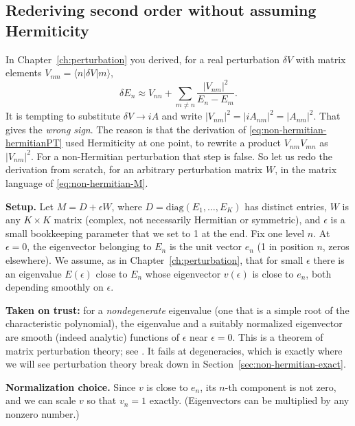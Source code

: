 \subsection{Rederiving second order without assuming Hermiticity}

In Chapter~\ref{ch:perturbation} you derived, for a real perturbation $\delta V$ with matrix elements $V_{nm}=\langle n|\delta V|m\rangle$,
\begin{equation}
\delta E_n \approx V_{nn} + \sum_{m\ne n}\frac{|V_{nm}|^2}{E_n-E_m}.
\label{eq:non-hermitian-hermitianPT}
\end{equation}
It is tempting to substitute $\delta V\to iA$ and write $|V_{nm}|^2=|iA_{nm}|^2=|A_{nm}|^2$. That gives the \emph{wrong sign}. The reason is that the derivation of \eqref{eq:non-hermitian-hermitianPT} used Hermiticity at one point, to rewrite a product $V_{nm}V_{mn}$ as $|V_{nm}|^2$. For a non-Hermitian perturbation that step is false. So let us redo the derivation from scratch, for an arbitrary perturbation matrix $W$, in the matrix language of \eqref{eq:non-hermitian-M}.

\textbf{Setup.} Let $M = D + \epsilon W$, where $D=\mathrm{diag}(E_1,\dots,E_K)$ has distinct entries, $W$ is any $K\times K$ matrix (complex, not necessarily Hermitian or symmetric), and $\epsilon$ is a small bookkeeping parameter that we set to 1 at the end. Fix one level $n$. At $\epsilon=0$, the eigenvector belonging to $E_n$ is the unit vector $e_n$ (1 in position $n$, zeros elsewhere). We assume, as in Chapter~\ref{ch:perturbation}, that for small $\epsilon$ there is an eigenvalue $E(\epsilon)$ close to $E_n$ whose eigenvector $v(\epsilon)$ is close to $e_n$, both depending smoothly on $\epsilon$.

\begin{beyond}
\textbf{Taken on trust:} for a \emph{nondegenerate} eigenvalue (one that is a simple root of the characteristic polynomial), the eigenvalue and a suitably normalized eigenvector are smooth (indeed analytic) functions of $\epsilon$ near $\epsilon=0$. This is a theorem of matrix perturbation theory; see \cite{trefethen}. It fails at degeneracies, which is exactly where we will see perturbation theory break down in Section~\ref{sec:non-hermitian-exact}.
\end{beyond}

\textbf{Normalization choice.} Since $v$ is close to $e_n$, its $n$-th component is not zero, and we can scale $v$ so that $v_n=1$ exactly. (Eigenvectors can be multiplied by any nonzero number.)

